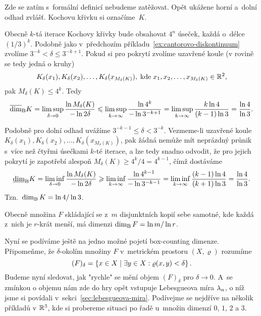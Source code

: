 \begin{example}\label{ex:kochova-krivka}
    Zde se zatím s~formální definicí nebudeme zatěžovat. Opět ukážene horní a~dolní odhad zvlášť. Kochovu křivku si označíme~$K$.

    Obecně $k$-tá iterace Kochovy křivky bude obsahovat $4^n$ úseček, každá o~délce $(1/3)^k$. Podobně jako v~předchozím příkladu~\ref{ex:cantorovo-diskontinuum} zvolíme $3^{-k}<\delta\leqslant 3^{-k+1}$. Pokud si pro pokrytí zvolíme uzavřené koule (v rovině se tedy jedná o kruhy)
    \[K_\delta(x_1),K_\delta(x_2),\ldots,K_\delta(x_{M_\delta(K)}),\;\text{kde}\;x_1,x_2,\ldots,x_{M_\delta(K)}\in\mathbb{R}^2,\]
    pak $M_\delta(K)\leqslant 4^k$. Tedy
    \[\overline{\dim}_\textup{B}{K}=\limsup_{\delta\to 0}\dfrac{\ln{M_\delta(K)}}{-\ln{2\delta}}\leqslant\limsup_{k\to\infty}\dfrac{\ln{4^k}}{-\ln{3^{-k+1}}}=\limsup_{k\to\infty}\dfrac{k\ln{4}}{(k-1)\ln{3}}=\dfrac{\ln{4}}{\ln{3}}.\]

    Podobně pro dolní odhad uvážíme $3^{-k-1}\leqslant\delta<3^{-k}$. Vezmeme-li uzavřené koule $K_\delta(x_1),K_\delta(x_2),\ldots,K_\delta(x_{M_\delta(K)})$, pak žádná nemůže mít neprázdný průnik s~více než čtyřmi úsečkami $k$-té iterace, a lze tedy snadno odvodit, že pro jejich pokrytí je zapotřebí alespoň $M_\delta(K)\geqslant 4^k/4=4^{k-1}$, čímž dostáváme
    \[\underline{\dim}_\textup{B}{K}=\liminf_{\delta\to 0}\dfrac{\ln{M_\delta(K)}}{-\ln{2\delta}}\geqslant\liminf_{k\to\infty}\dfrac{\ln{4^{k-1}}}{-\ln{3^{-k-1}}}=\liminf_{k\to\infty}\dfrac{(k-1)\ln{4}}{(k+1)\ln{3}}=\dfrac{\ln{4}}{\ln{3}}.\]
    Tzn.~$\operatorname{dim_B}{K}=\ln{4}/\ln{3}$.
\end{example}
\begin{remark}
    Obecně množina $F$ skládající se z~$m$ disjunktních kopií sebe samotné, kde každá z~nich je $r$-krát menší, má dimenzi $\operatorname{dim_B}{F}=\ln{m}/\ln{r}$. \cite{Falconer1989}
\end{remark}
Nyní se podíváme ještě na jedno možné pojetí box-counting dimenze. Připomeňme, že $\delta$-okolím množiny $F$ v~metrickém prostoru $(X,\varrho)$ rozumíme
\[(F)_\delta=\left\{x\in X\mid\exists y\in X: \varrho(x,y)<\delta\right\}.\]
Budeme nyní sledovat, jak "rychle" se mění objem $(F)_\delta$ pro $\delta\to 0$. A~se zmínkou o objemu nám zde do hry opět vstupuje Lebesgueova míra $\lambda_n$, o níž jsme si povídali v~sekci~\ref{sec:lebesgueova-mira}. Podívejme se nejdříve na několik příkladů v $\mathbb{R}^3$, kde si probereme situaci po řadě u~množin dimenzí $0$, $1$, $2$ a $3$.
